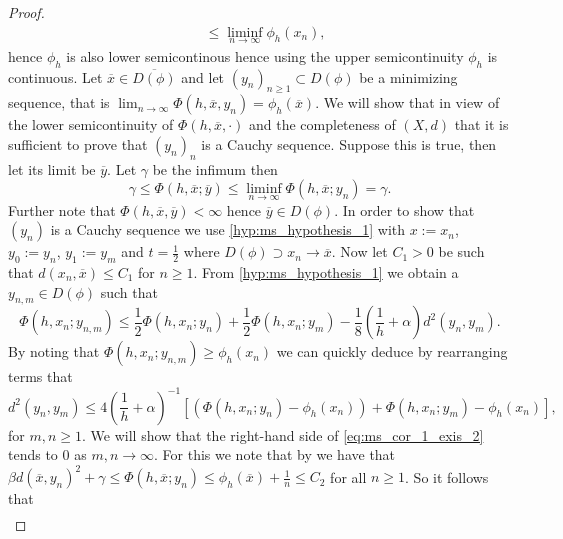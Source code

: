 \documentclass[a4paper,11pt, leqno]{scrreprt} %
\renewcommand{\leq}{\leqslant}
\renewcommand{\leq}{\leqslant}
\renewcommand{\geq}{\geqslant}
\theoremstyle{change}
\theoremstyle{nonumberplain}
\newtheorem{proof}{Proof}
\begin{document}
\begin{proof}
\begin{equation}
\begin{split}
      &\leq \liminf_{n \to \infty} \phi_h(x_n),
    \end{split}
  \end{equation}
  hence $\phi_h$ is also lower semicontinous hence using the upper
  semicontinuity $\phi_h$ is continuous.
  Let $\overline{x} \in \overline{D(\phi)}$ and let $(y_n)_{n \geq 1}
  \subset D(\phi)$ be a minimizing sequence, that is $\lim_{n \to
    \infty} \Phi(h, \overline{x}, y_n) = \phi_h(\overline{x})$. We
  will show that in view of the lower semicontinuity of $\Phi(h,
  \overline{x}, \cdot)$ and the completeness of $(X, d)$ that it is
  sufficient to prove that $(y_n)_n$ is a Cauchy sequence. Suppose
  this is true, then let its limit be $\overline{y}$. Let $\gamma$ be
  the infimum then
  \begin{equation*}
    \gamma \leq \Phi(h, \overline{x}; \overline{y}) \leq \liminf_{n
      \to \infty} \Phi(h, \overline{x}; y_n) = \gamma.
  \end{equation*}
  Further note that $\Phi(h, \overline{x}, \overline{y}) < \infty$
  hence $\overline{y} \in D(\phi)$. In order to show that $(y_n)$ is a
  Cauchy sequence we use \ref{hyp:ms_hypothesis_1} with $x := x_n$,
  $y_0 := y_n$, $y_1 := y_m$ and $t = \frac12$ where $D(\phi) \supset
  x_n \to \overline x$. Now let $C_1 > 0$ be such that $d(x_n,
  \overline x) \leq C_1$ for $n \geq 1$. From
  \ref{hyp:ms_hypothesis_1} we obtain a $y_{n,m} \in D(\phi)$ such
  that
  \begin{equation}
    \label{eq:ms_cor_1_exis_1}
    \Phi(h, x_n; y_{n, m}) \leq \frac12 \Phi(h, x_n; y_n) + \frac12
    \Phi(h, x_n; y_m) - \frac18 \left ( \frac1h + \alpha \right)
    d^2(y_n, y_m).
  \end{equation}
  By noting that $\Phi(h, x_n; y_{n, m}) \geq \phi_h(x_n)$ we can
  quickly deduce by rearranging terms that
  \begin{equation}
    \label{eq:ms_cor_1_exis_2}
    d^2(y_n, y_m) \leq 4 \left (\frac1h + \alpha \right )^{-1}
    [(\Phi(h, x_n; y_n) - \phi_h(x_n)) + \Phi(h, x_n; y_m) - \phi_h(x_n)],
  \end{equation}
  for $m, n \geq 1$. We will show that the right-hand side of
  \eqref{eq:ms_cor_1_exis_2} tends to $0$ as $m, n \to \infty$. For
  this we note that by  we have that $\beta d(\overline
  x, y_n)^2 + \gamma \leq \Phi(h, \overline x; y_n) \leq
  \phi_h(\overline x) + \frac1n \leq C_2$ for all $n \geq 1$. So it
  follows that
  \begin{equation}
    \label{eq:ms_cor_1_exis_3}
    \begin{split}

\end{split}
\end{equation}
\end{proof}
\end{document}
